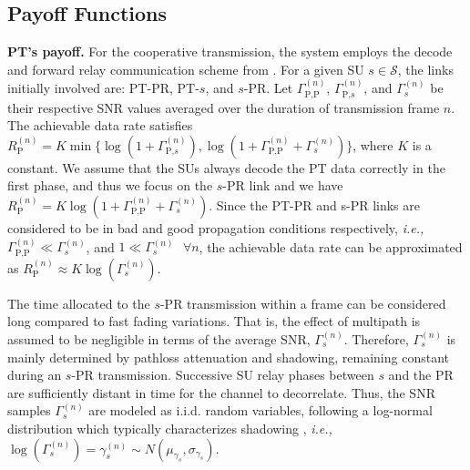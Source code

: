 \subsection {Payoff Functions}

\textbf{PT's payoff.} For the cooperative transmission, the system employs the decode and forward relay communication scheme from \cite{ref:Laneman2001}. 
For a given SU $s\in\mathcal{S}$, the links initially involved are: PT-PR, PT-$s$, and $s$-PR. Let $\Gamma_{\text{P,P}}^{(n)}$, $\Gamma_{\text{P,}s}^{(n)}$, and $\Gamma_{s}^{(n)}$ be their respective SNR values averaged over the duration of transmission frame $n$.
The achievable data rate satisfies
$R_{\text{P}}^{(n)} = K\min\{\log(1+\Gamma_{\text{P,}s}^{(n)}),\log(1+\Gamma_{\text{P,P}}^{(n)}+\Gamma_{s}^{(n)})\}$, where $K$ is a constant.
We assume that the SUs always decode the PT data correctly in the first phase, and thus we focus on the $s$-PR link and 
we have 
$R_{\text{P}}^{(n)} = K\log(1+\Gamma_{\text{P,P}}^{(n)}+\Gamma_{s}^{(n)})$.
Since the PT-PR and s-PR links are considered to be in bad and good propagation conditions respectively, \textit{i.e.,} $\Gamma_{\text{P,P}}^{(n)}\ll\Gamma_{s}^{(n)}$, and $1 \ll\Gamma_{s}^{(n)}\text{ }\forall n$, the achievable data rate can be approximated as
$R_{\text{P}}^{(n)} \approx K\log(\Gamma_{s}^{(n)})$.

The time allocated to the $s$-PR transmission within a frame can be considered long compared to fast fading variations. That is, the effect of multipath is assumed to be negligible in terms of the average SNR, $\Gamma_s^{(n)}$. Therefore, $\Gamma_s^{(n)}$ is mainly determined by pathloss attenuation and shadowing, remaining constant during an $s$-PR transmission. Successive SU relay phases between $s$ and the PR are sufficiently distant in time for the channel to decorrelate. Thus, the SNR samples $\Gamma_s^{(n)}$ are modeled as i.i.d. random variables, following a log-normal distribution which typically characterizes shadowing \cite{ref:Goldsmith2009}, \textit{i.e.,} $\log(\Gamma_s^{(n)})=\gamma_s^{(n)} \sim N(\mu_{\gamma_s},\sigma_{\gamma_s})$. 

